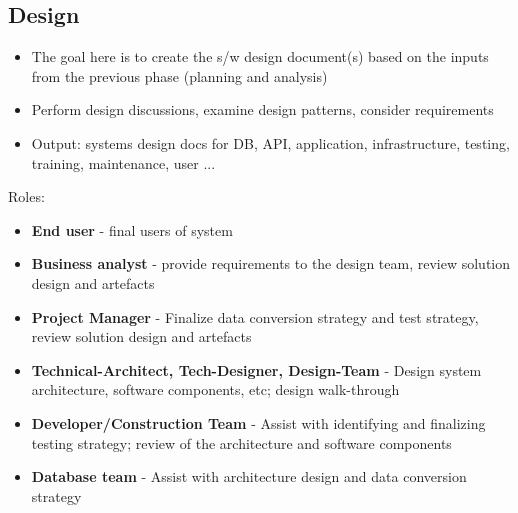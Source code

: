 \documentclass{article}[18pt]
\begin{document}
\subsection{Design}
\begin{itemize}
	\item The goal here is to create the s/w design document(s) based on the inputs from the previous phase (planning and analysis)
	\item Perform design discussions, examine design patterns, consider requirements
	\item Output: systems design docs for DB, API, application, infrastructure, testing, training, maintenance, user ...
\end{itemize}
Roles:
\begin{itemize}
	\item \textbf{End user} - final users of system
	\item \textbf{Business analyst} - provide requirements to the design team, review solution design and artefacts
	\item \textbf{Project Manager} - Finalize data conversion strategy and test strategy, review solution design and artefacts
	\item \textbf{Technical-Architect, Tech-Designer, Design-Team} - Design system architecture, software components, etc; design walk-through
	\item \textbf{Developer/Construction Team} - Assist with identifying and finalizing testing strategy; review of the architecture and software components
	\item \textbf{Database team} - Assist with architecture design and data conversion strategy
\end{itemize}
\end{document}

